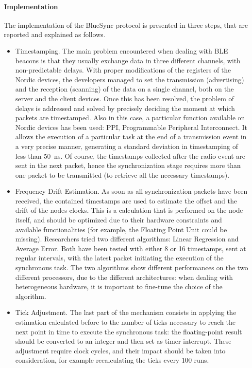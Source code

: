 \paragraph{Implementation} The implementation of the BlueSync protocol is presented in three steps, that are reported and explained as follows.
\begin{itemize}
    \item Timestamping. The main problem encountered when dealing with BLE beacons is that they usually exchange data in three different channels, with non-predictable delays. With proper modifications of the registers of the Nordic devices, the developers managed to set the transmission (advertising) and the reception (scanning) of the data on a single channel, both on the server and the client devices. Once this has been resolved, the problem of delays is addressed and solved by precisely deciding the moment at which packets are timestamped. Also in this case, a particular function available on Nordic devices has been used: PPI, Programmable Peripheral Interconnect. It allows the execution of a particular task at the end of a transmission event in a very precise manner, generating a standard deviation in timestamping of less than 50~ns. Of course, the timestamps collected after the radio event are sent in the next packet, hence the synchronization stage requires more than one packet to be transmitted (to retrieve all the necessary timestamps).
    \item Frequency Drift Estimation. As soon as all synchronization packets have been received, the contained timestamps are used to estimate the offset and the drift of the nodes clocks. This is a calculation that is performed on the node itself, and should be optimized due to their hardware constraints and available functionalities (for example, the Floating Point Unit could be missing). Researchers tried two different algorithms: Linear Regression and Average Error. Both have been tested with either 8 or 16 timestamps, sent at regular intervals, with the latest packet initiating the execution of the synchronous task. The two algorithms show different performances on the two different processors, due to the different architectures: when dealing with heterogeneous hardware, it is important to fine-tune the choice of the algorithm. 
    \item Tick Adjustment. The last part of the mechanism consists in applying the estimation calculated before to the number of ticks necessary to reach the next point in time to execute the synchronous task: the floating-point result should be converted to an integer and then set as timer interrupt. These adjustment require clock cycles, and their impact should be taken into consideration, for example recalculating the ticks every 100 runs.
\end{itemize}

